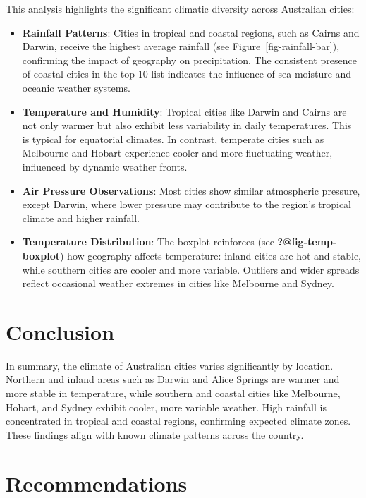 \documentclass[
  letterpaper,
  DIV=11,
  numbers=noendperiod]{scrartcl}
\begin{document}
This analysis highlights the significant climatic diversity across
Australian cities:

\begin{itemize}
\item
  \textbf{Rainfall Patterns}: Cities in tropical and coastal regions,
  such as Cairns and Darwin, receive the highest average rainfall (see
  Figure~\ref{fig-rainfall-bar}), confirming the impact of geography on
  precipitation. The consistent presence of coastal cities in the top 10
  list indicates the influence of sea moisture and oceanic weather
  systems.
\item
  \textbf{Temperature and Humidity}: Tropical cities like Darwin and
  Cairns are not only warmer but also exhibit less variability in daily
  temperatures. This is typical for equatorial climates. In contrast,
  temperate cities such as Melbourne and Hobart experience cooler and
  more fluctuating weather, influenced by dynamic weather fronts.
\item
  \textbf{Air Pressure Observations}: Most cities show similar
  atmospheric pressure, except Darwin, where lower pressure may
  contribute to the region's tropical climate and higher rainfall.
\item
  \textbf{Temperature Distribution}: The boxplot reinforces (see
  \textbf{?@fig-temp-boxplot}) how geography affects temperature: inland
  cities are hot and stable, while southern cities are cooler and more
  variable. Outliers and wider spreads reflect occasional weather
  extremes in cities like Melbourne and Sydney.
\end{itemize}

\section{Conclusion}\label{conclusion}

In summary, the climate of Australian cities varies significantly by
location. Northern and inland areas such as Darwin and Alice Springs are
warmer and more stable in temperature, while southern and coastal cities
like Melbourne, Hobart, and Sydney exhibit cooler, more variable
weather. High rainfall is concentrated in tropical and coastal regions,
confirming expected climate zones. These findings align with known
climate patterns across the country.

\section{Recommendations}\label{recommendations}
\end{document}
